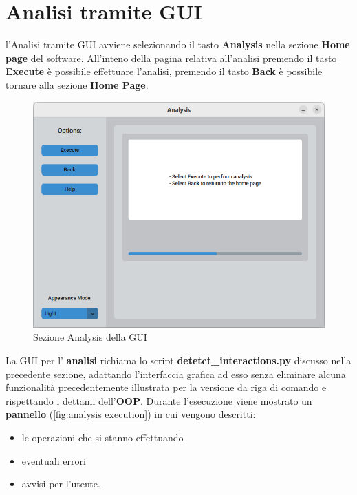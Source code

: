 \section{Analisi tramite GUI}
l'Analisi tramite GUI avviene selezionando il tasto \textbf{Analysis} nella sezione \textbf{Home page} del software. All'inteno della pagina relativa all'analisi premendo il tasto \textbf{Execute} è possibile effettuare l'analisi, premendo il tasto \textbf{Back} è possibile tornare alla sezione \textbf{Home Page}.

\begin{figure}[H]
    \centering
    \includegraphics[scale=0.6]{immagini/capitolo3/analysis.png}
    \caption{Sezione Analysis della GUI}
    \label{fig:analisys}
\end{figure}

La GUI per l' \textbf{analisi} richiama lo script \textbf{detetct\_interactions.py} discusso nella precedente sezione, adattando l'interfaccia grafica ad esso senza eliminare alcuna funzionalità precedentemente illustrata per la versione da riga di comando e rispettando i dettami dell'\textbf{OOP}.\newline
Durante l'esecuzione viene mostrato un \textbf{pannello} (\ref{fig:analysis execution}) in cui vengono descritti: 

\begin{itemize} 
    \item le operazioni che si stanno effettuando
    \item eventuali errori
    \item avvisi per l'utente.  
\end{itemize}

